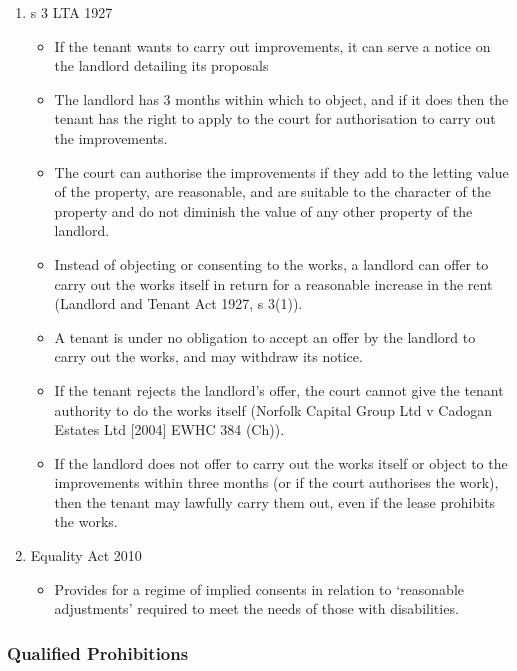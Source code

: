 \documentclass[
]{article}
\providecommand{\tightlist}{%
  \setlength{\itemsep}{0pt}\setlength{\parskip}{0pt}}
\begin{document}
\begin{enumerate}
\tightlist
\item
  s 3 LTA 1927

  \begin{itemize}
  \tightlist
  \item
    If the tenant wants to carry out improvements, it can serve a notice
    on the landlord detailing its proposals
  \item
    The landlord has 3 months within which to object, and if it does
    then the tenant has the right to apply to the court for
    authorisation to carry out the improvements.
  \item
    The court can authorise the improvements if they add to the letting
    value of the property, are reasonable, and are suitable to the
    character of the property and do not diminish the value of any other
    property of the landlord.
  \item
    Instead of objecting or consenting to the works, a landlord can
    offer to carry out the works itself in return for a reasonable
    increase in the rent (Landlord and Tenant Act 1927, s 3(1)).
  \item
    A tenant is under no obligation to accept an offer by the landlord
    to carry out the works, and may withdraw its notice.
  \item
    If the tenant rejects the landlord's offer, the court cannot give
    the tenant authority to do the works itself (Norfolk Capital Group
    Ltd v Cadogan Estates Ltd {[}2004{]} EWHC 384 (Ch)).
  \item
    If the landlord does not offer to carry out the works itself or
    object to the improvements within three months (or if the court
    authorises the work), then the tenant may lawfully carry them out,
    even if the lease prohibits the works.
  \end{itemize}
\item
  Equality Act 2010

  \begin{itemize}
  \tightlist
  \item
    Provides for a regime of implied consents in relation to `reasonable
    adjustments' required to meet the needs of those with disabilities.
  \end{itemize}
\end{enumerate}

\hypertarget{qualified-prohibitions}{%
\subsubsection{Qualified Prohibitions}\label{qualified-prohibitions}}
\end{document}
